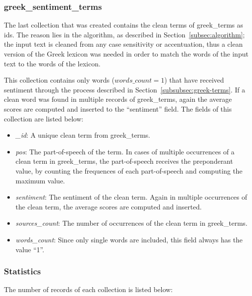 \subsubsection{greek\_sentiment\_terms}
\label{subsubsec:greek-sentiment-terms}

The last collection that was created
contains the clean terms of greek\_terms as ids.
The reason lies in the algorithm,
as described in Section~\ref{subsec:algorithm};
the input text is cleaned from any case sensitivity or accentuation,
thus a clean version of the Greek lexicon was needed
in order to match the words of the input text to the words of the lexicon.

This collection contains only words ($words\_count = 1$)
that have received sentiment through the process
described in Section~\ref{subsubsec:greek-terms}.
If a clean word was found in multiple records of greek\_terms,
again the average scores are computed and inserted
to the ``sentiment'' field.
The fields of this collection are listed below:

\begin{itemize}
 \item \emph{\_id}: A unique clean term from greek\_terms.
 
 \item \emph{pos}: The part-of-speech of the term.
 In cases of multiple occurrences of a clean term in greek\_terms,
 the part-of-speech receives the preponderant value,
 by counting the frequences of each part-of-speech
 and computing the maximum value.
 
 \item \emph{sentiment}: The sentiment of the clean term.
 Again in multiple occurrences of the clean term,
 the average scores are computed and inserted.
 
 \item \emph{sources\_count}: The number of occurrences
 of the clean term in greek\_terms.
 
 \item \emph{words\_count}: Since only single words are included,
 this field always has the value ``1''.
\end{itemize}

\subsubsection{Statistics}
\label{subsubsec:statistics}

The number of records of each collection is listed below:

